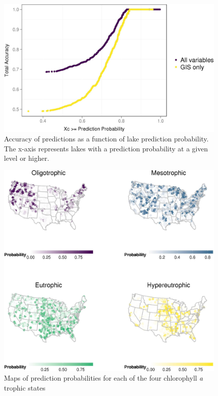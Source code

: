 \documentclass[12pt,]{article}
\begin{document}
\newpage

\begin{figure}[htbp]
\centering
\includegraphics{manuscript_files/figure-latex/cond_prob_fig-1.jpeg}
\caption{Accuracy of predictions as a function of lake prediction
probability. The x-axis represents lakes with a prediction probability
at a given level or higher. \label{fig:cond_prob_fig}}
\end{figure}

\newpage

\begin{figure}[htbp]
\centering
\includegraphics{manuscript_files/figure-latex/gis_probability_map-1.jpeg}
\caption{Maps of prediction probabilities for each of the four
chlorophyll \textit{a} trophic states \label{fig:gis_probability_map}}
\end{figure}
\end{document}
